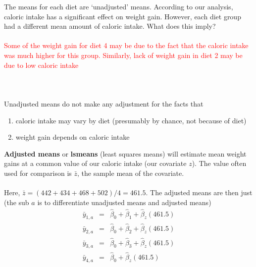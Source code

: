 The means for each diet are `unadjusted' means.  According to our analysis, caloric intake has a significant effect on weight gain.  However, each diet group had a different mean amount of caloric intake.  What does this imply?%
\textcolor{red}{\\~\\Some of the weight gain for diet 4 may be due to the fact that the caloric intake was much higher for this group.  Similarly, lack of weight gain in diet 2 may be due to low caloric intake}  \\~\\~\\~\\

Unadjusted means do not make any adjustment for the facts that 
\begin{enumerate}
\item caloric intake may vary by diet (presumably by chance, not because of diet)
\item weight gain depends on caloric intake
\end{enumerate}

\newpage

\textbf{Adjusted means} or \textbf{lsmeans} (least squares means) will estimate mean weight gains at a common value of our caloric intake (our covariate $z$).  The value often used for comparison is $\bar{z}$, the sample mean of the covariate.\\~\\

Here, $\bar{z}= (442+434+468+502)/4 = 461.5$.  The adjusted means are then just (the sub $a$ is to differentiate unadjusted means and adjusted means)
\begin{eqnarray*}
\bar{y}_{1,a} & = & \hat\beta_0 + \hat\beta_1 + \hat\beta_z (461.5) \\
\bar{y}_{2,a} & = & \hat\beta_0 + \hat\beta_2 + \hat\beta_z (461.5) \\
\bar{y}_{3,a} & = & \hat\beta_0 + \hat\beta_3 + \hat\beta_z (461.5) \\
\bar{y}_{4,a} & = & \hat\beta_0 + \hat\beta_z (461.5)
\end{eqnarray*} 

